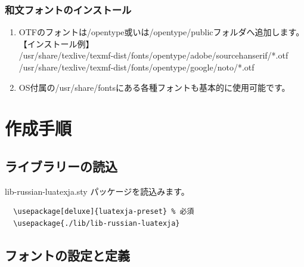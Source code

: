 \documentclass[a4paper,10pt]{ltjsarticle}
\def\colH#1{\color[HTML]{#1}}
\begin{document}
\subsubsection{和文フォントのインストール}

\begin{enumerate}
  \item OTFのフォントは/opentype或いは/opentype/publicフォルダへ追加します。\\
【インストール例】\\
/usr/share/texlive/texmf-dist/fonts/opentype/adobe/sourcehanserif/*.otf\\
/usr/share/texlive/texmf-dist/fonts/opentype/google/noto/*.otf  
  \item OS付属の/usr/share/fontsにある各種フォントも基本的に使用可能です。\vspace{-2mm}
\end{enumerate}

\section{作成手順}

\subsection{ライブラリーの読込}
{\colH{800000} lib-russian-luatexja.sty} パッケージを読込みます。
\vspace{-2mm}
\begin{verbatim}
  \usepackage[deluxe]{luatexja-preset} % 必須
  \usepackage{./lib/lib-russian-luatexja} 
\end{verbatim}
\vspace{-6mm}
    
\subsection{フォントの設定と定義}
\end{document}
